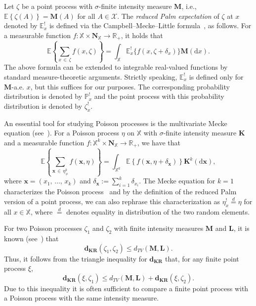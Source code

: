 \documentclass[AHL,Unicode,longabstracts]{cedram}
\newcommand*\bL{\mathbf{L}}
\newcommand*\bM{\mathbf{M}}
\newcommand*\bN{\mathbf{N}}
\newcommand*\bK{\mathbf{K}}
\newcommand{\bx}{\mathbf{x}}
\newcommand*\dkr{\mathbf{d_{KR}}}
\newcommand*\R{\mathbb{R}}
\renewcommand*\P{\mathbb{P}}
\newcommand*\X{\mathbb{X}}
\newcommand{\E}{\mathbb{E}}
\newcommand*\cX{\mathcal{X}}
\newcommand*\md{\mathrm{d}}
\newcommand{\mean}[1] {\E\left\{{#1}\right\}}
\newcommand*{\MK}{\mkern 2mu}
\begin{document}
Let $\zeta$ be a point process with $\sigma$-finite intensity measure $\bM$, i.e., $\mean{\zeta(A)}=\bM(A)$ for all $A\in\cX$. The {\em reduced Palm expectation} of $\zeta$ at $x$ denoted by $\E^{!}_{x}$ is defined via the Campbell--Mecke--Little formula~\cite[Corollary~3.1.14]{Baccelli2020}, as follows. For a measurable function $f : \X \times \bN_{\X} \to \R_+$, it holds that
\begin{equation}\label{e:clm}
\mean{\sum_{x\,\in\,\zeta} f(x,\zeta)} = \int_{\X}\E^{!}_{x}\big\{f\left(x,\zeta +\delta_{x}\right)\big\} \bM(\md x).
\end{equation}
The above formula can be extended to integrable real-valued functions by standard measure-theoretic arguments. Strictly speaking, $\E^{!}_{x}$ is defined only for $\bM$-a.e. $x$, but this suffices for our purposes. The corresponding probability distribution is denoted by $\P^{!}_{x}$ and the point process with this probability distribution is denoted by $\zeta^{!}_x$.

An essential tool for studying Poisson processes is the multivariate Mecke equation (see~\cite[Theorem~4.4]{LastPenrose17}). For a Poisson process $\eta$ on $\X$ with $\sigma$-finite intensity measure $\bK$ and a measurable function $f : \X^k \times \bN_{\X} \to \R_+$, we have that
\begin{equation}\label{e:mmecke}
\mean{\sum_{\bx\,\in\,\eta^k_{\ne}} f(\bx,\eta)} = \int_{\X^k}\mean{f\left(\bx,\eta+\delta_{\bx}\right)}\bK^k(\md \bx),
\end{equation}
where $\bx = (x_1,\,\ldots,\,x_k)$ and $\delta_{\bx} := \sum_{i=1}^k \delta_{x_i}$. The Mecke equation for $k = 1$ characterizes the Poisson process~\cite[Theorem~4.1]{LastPenrose17} and by the definition of the reduced Palm version of a point process, we can also rephrase this characterization as $\eta^{!}_x \stackrel{d}{=} \eta$ for all $x \in \X$, where $\stackrel{d}{=}$ denotes equality in distribution of the two random elements.

For two Poisson processes $\zeta_1$ and $\zeta_2$ with finite intensity measures $\bM$ and $\bL$, it is known (see~\cite[Remark~3.2$\MK$(iv)]{decreusefond_functional_2016}) that
\begin{equation}\label{e:dkrPoisson0}
\dkr(\zeta_1,\zeta_2)\leq d_{TV}(\bM,\bL).
\end{equation}
Thus, it follows from the triangle inequality for $\dkr$ that, for any finite point process $\xi$,
\begin{equation}\label{e:dkrPoisson}
\dkr(\xi,\zeta_1) \leq d_{TV}(\bM,\bL) + \dkr(\xi,\zeta_2).
\end{equation}
Due to this inequality it is often sufficient to compare a finite point process with a Poisson process with the same intensity measure.
\end{document}
